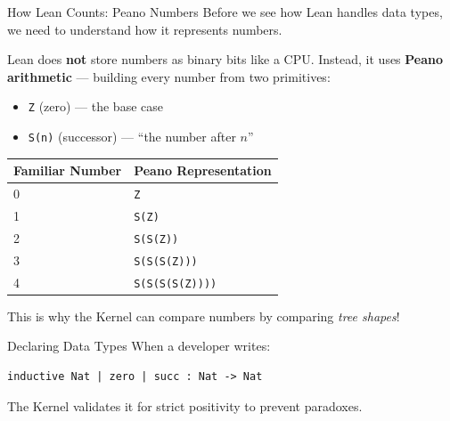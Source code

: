 \documentclass[10pt,aspectratio=169]{beamer}
\begin{document}
\begin{frame}[fragile]{How Lean Counts: Peano Numbers}
    Before we see how Lean handles data types, we need to understand how it represents numbers.
    
    \vspace{0.5em}
    Lean does \textbf{not} store numbers as binary bits like a CPU. Instead, it uses \textbf{Peano arithmetic} — building every number from two primitives:
    \begin{itemize}
        \item \verb|Z| (zero) — the base case
        \item \verb|S(n)| (successor) — ``the number after $n$''
    \end{itemize}
    
    \vspace{0.5em}
    \begin{center}
    \begin{tabular}{l l}
        \toprule
        \textbf{Familiar Number} & \textbf{Peano Representation} \\
        \midrule
        0 & \verb|Z| \\
        1 & \verb|S(Z)| \\
        2 & \verb|S(S(Z))| \\
        3 & \verb|S(S(S(Z)))| \\
        4 & \verb|S(S(S(S(Z))))| \\
        \bottomrule
    \end{tabular}
    \end{center}
    
    This is why the Kernel can compare numbers by comparing \textit{tree shapes}!
\end{frame}

\begin{frame}[fragile]{Declaring Data Types}
    When a developer writes:
    \begin{lstlisting}[language={}]
inductive Nat | zero | succ : Nat -> Nat
    \end{lstlisting}
    The Kernel validates it for strict positivity to prevent paradoxes.
\end{frame}
\end{document}
